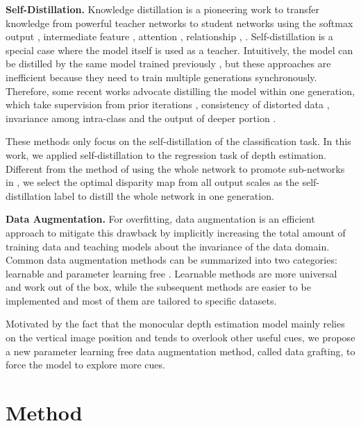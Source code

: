 \documentclass[10pt,twocolumn,letterpaper]{article}
\begin{document}
\noindent
{\bf Self-Distillation.} Knowledge distillation is a pioneering work 
to transfer knowledge from powerful teacher networks to student 
networks using the softmax output \cite{Hinton2015}, intermediate feature 
\cite{Romero2015,Heo2019}, attention \cite{Zagoruyko2017,Hou2019}, 
relationship \cite{Yim2017,Park2019,Peng2019}, \etc. 
Self-distillation is a special case where the model 
itself is used as a teacher. Intuitively, the model can be 
distilled by the same model trained previously \cite{Furlanello2018}, 
but these approaches are inefficient because they need to train multiple 
generations synchronously. Therefore, some recent works advocate distilling 
the model within one generation, which take supervision from prior iterations 
\cite{Yang2019,Kim2020}, consistency of distorted data \cite{Xu2019}, 
invariance among intra-class \cite{Yun2020} and the output of deeper portion \cite{Zhang2019}.

These methods only focus on the self-distillation of the classification task. 
In this work, we applied self-distillation to the regression task of depth 
estimation. Different from the method of 
using the whole network to promote sub-networks in \cite{Pilzer2019}, we select 
the optimal disparity map from all output scales as the self-distillation label 
to distill the whole network in one generation.

\noindent
{\bf Data Augmentation.}  
For overfitting, data augmentation is an efficient approach to mitigate 
this drawback by implicitly increasing 
the total amount of training data and teaching models about the 
invariance of the data domain. Common data augmentation methods can 
be summarized into two categories: learnable \cite{Tran2017,Cubuk2019} 
and parameter learning free \cite{Krizhevsky2012,devries2017improved,Zhang2017,Yun2019, Zhong2020}. 
Learnable methods are more universal and work out of the box, while 
the subsequent methods are easier to be implemented and most of them are tailored 
to specific datasets.

Motivated by the fact that the monocular depth estimation model mainly relies on the 
vertical image position and tends to overlook other useful cues, we propose a new parameter 
learning free data augmentation method, called data grafting, to force the model to 
explore more cues.

\section{Method}
\end{document}
